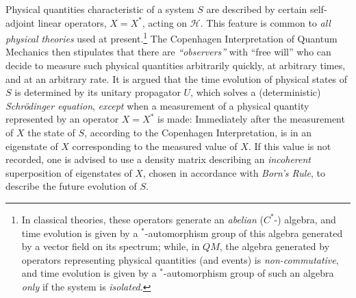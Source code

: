 \documentclass[12pt]{article}
\begin{document}
Physical quantities characteristic of a system $S$ are described by certain self-adjoint linear operators, $X=X^{*}$, acting on $\mathcal{H}$. This feature is common to \textit{all physical theories} used at present.\footnote{In classical theories, these operators generate an \textit{abelian} ($C^{*}$-) algebra, and time evolution is given by a $^{*}$-automorphism group of this algebra generated by a vector field on its spectrum; while, in $QM$, the algebra generated by operators representing physical quantities (and events) is \textit{non-commutative}, and time evolution is given by a $^{*}$-automorphism group of such an algebra \textit{only} if the system is \textit{isolated}.} The Copenhagen Interpretation of Quantum Mechanics then stipulates that there are \textit{``observers''} with ``free will'' who can decide to measure such physical quantities arbitrarily quickly, at arbitrary times, and at an arbitrary rate. It is argued that the time evolution of physical states of $S$ is determined by its unitary propagator $U$, which solves a (deterministic) \textit{Schr\"{o}dinger equation}, \textit{except} when a measurement of a physical quantity represented by an operator $X=X^{*}$ is made: Immediately after the measurement of $X$ the state of $S$, according to the Copenhagen Interpretation, is in an eigenstate of $X$ corresponding to the measured value of $X$. If this value is not recorded, one is advised to use a density matrix describing an \textit{incoherent} superposition of eigenstates of $X$, chosen in accordance with \textit{Born's Rule}, to describe the future evolution of $S$. 
\end{document}
